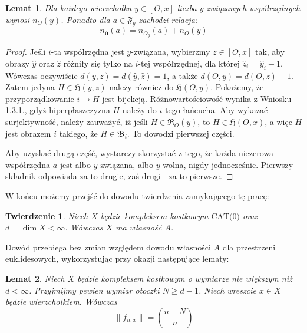 \documentclass[licencjacka]{pracamgr}
\theoremstyle{definition}
\theoremstyle{definition}
\theoremstyle{definition}
\theoremstyle{definition}
\theoremstyle{definition}
\theoremstyle{plain}
\newtheorem{lemma}{Lemat}[section]
\theoremstyle{plain}
\newtheorem{theorem}{Twierdzenie}[section]
\begin{document}
\begin{lemma}
	Dla każdego wierzchołka $ y \in [O,x] $ liczba $ y $-związanych współrzędnych 
	wynosi $ n_O (y) $. Ponadto dla $ a \in \mathfrak{F}_y $ zachodzi relacja:
	$$ n_{\textbf{0}}(a) = n_{O_y}(a) + n_O(y) $$
\end{lemma}
\begin{proof}
	Jeśli $ i $-ta współrzędna jest $ y $-związana, wybierzmy $ z\in[O,x] $ tak, aby 
	obrazy $ \hat y $ oraz $ \hat z $ różniły się tylko na $ i $-tej współrzędnej, dla której 
	$ \hat z_i = \hat y_i - 1  $. Wówczas oczywiście $ d(y,z) = d(\hat y, \hat z) = 1 $, a 
	także $ d(O,y) = d(O,z) + 1 $. Zatem jedyna $ H \in \mathfrak{H}(y,z) $ należy 
	również do $ \mathfrak{H}(O,y) $. Pokażemy, że przyporządkowanie $ i \rightarrow H $ jest 
	bijekcją. Różnowartościowość wynika z Wniosku 1.3.1., gdyż hiperpłaszczyzna 
	$ H $ należy do $ i $-tego łańcucha. Aby wykazać surjektywność, należy zauważyć, iż 
	jeśli $ H \in \mathfrak{R}_O(y) $, to $ H \in \mathfrak{H}(O,x) $, a więc 
	$ H $ jest obrazem $ i $ takiego, że $ H \in \mathfrak{B}_i $. To dowodzi pierwszej 
	części.

	Aby uzyskać drugą część, wystarczy skorzystać z tego, że każda niezerowa współrzędna 
	$ a $ jest albo $ y $-związana, albo $ y $-wolna, nigdy jednocześnie. Pierwszy składnik 
	odpowiada za to drugie, zaś drugi - za to pierwsze.
\end{proof}

W końcu możemy przejść do dowodu twierdzenia zamykającego tę pracę:

\begin{theorem}
	Niech $ X $ będzie kompleksem kostkowym $\text{CAT(0)} $ oraz $ d= \dim X < \infty $. 
	Wówczas $ X $ ma własność $ A $.
\end{theorem}

Dowód przebiega bez zmian względem dowodu własności $ A $ dla przestrzeni euklidesowych, 
wykorzystując przy okazji następujące lematy:

\begin{lemma}
	Niech $ X $ będzie kompleksem kostkowym o wymiarze nie większym niż $ d < \infty$. 
	Przyjmijmy pewien wymiar otoczki $ N \geq d-1 $. Niech wreszcie $ x \in X $ będzie 
	wierzchołkiem. Wówczas 
	$$ \|f_{n,x}\| = {n + N \choose n} $$
\end{lemma}
\end{document}
